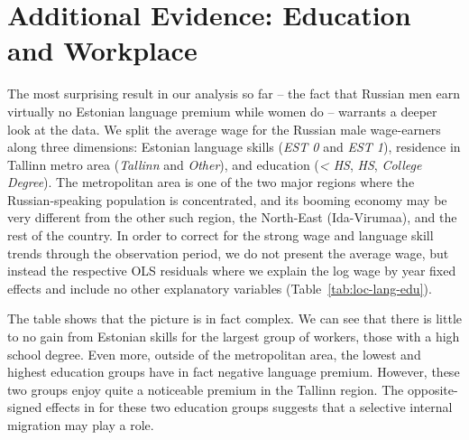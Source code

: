 \documentclass[12pt, a4paper]{article}
\begin{document}
\section{Additional Evidence: Education and Workplace}
\label{sec:segregation-analysis}

The most surprising result in our analysis so far -- the fact that
Russian men earn virtually no Estonian language premium while women do -- warrants a
deeper look at the data. We split the average wage for the Russian male wage-earners
along three
dimensions: Estonian language skills (\emph{EST 0} and \emph{EST 1}),
residence in Tallinn metro area (\emph{Tallinn} and \emph{Other}),
and education (\emph{< HS}, \emph{HS}, \emph{College Degree}). The metropolitan area is one of the two major regions
where the Russian-speaking population is concentrated, and its
booming economy may be very different from the other such region, the
North-East (Ida-Virumaa), and the rest of the country.
In order to correct for the strong wage and language skill trends
through the observation period, we do not present the average wage,
but instead the respective OLS residuals where we explain the log wage by year fixed
effects and include no other explanatory variables (Table~\ref{tab:loc-lang-edu}). 

The table shows that the picture is in fact complex. We can see
that there is little to no gain from Estonian skills for the
largest group of workers, those with a high school degree. Even more, outside of
the metropolitan area, the lowest and highest education groups
have in fact negative language premium. However, these two groups
enjoy quite a noticeable premium in the Tallinn region. The
opposite-signed effects in for these two education groups suggests
that a
selective internal migration may play a role.
\end{document}

